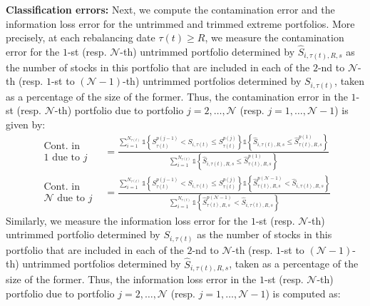 \textbf{Classification errors:} Next, we compute the contamination error and the information loss error for the untrimmed and trimmed extreme portfolios. More precisely, at each rebalancing date $\tau(t) \geq R$, we measure the contamination error for the $1$-st (resp. $\mathcal{N}$-th) untrimmed portfolio determined by $\widehat{S}_{i,\tau(t),R,s}$ as the number of stocks in this portfolio that are included in each of the $2$-nd to $\mathcal{N}$-th (resp. $1$-st to $(\mathcal{N}-1)$-th) untrimmed portfolios determined by $S_{i,\tau(t)}$, taken as a percentage of the size of the former. Thus, the contamination error in the $1$-st (resp. $\mathcal{N}$-th) portfolio due to portfolio $j=2,\ldots, \mathcal{N}$ (resp. $j=1,\ldots, \mathcal{N}-1$) is given by:
\begin{align*}
\begin{aligned}
\text{Cont. in}\\[-11pt]
\text{$1$ due to $j$} 
\end{aligned}
&= \frac{\sum_{i=1}^{N_{\tau(t)}} \mathds{1} \left\{ S_{\tau(t) }^{p(j-1)} < S_{i,\tau(t)} \leq S_{\tau(t) }^{p(j)} \right\} \mathds{1} \left\{ \widehat{S}_{i,\tau(t),R,s} \leq \widehat{S}_{\tau(t),R,s}^{p(1)}\right\}}{\sum_{i=1}^{N_{\tau(t)}} \mathds{1} \left\{ \widehat{S}_{i,\tau(t),R,s}\leq \widehat{S}_{\tau(t),R,s}^{p(1)}\right\}} \\
\begin{aligned}
\text{Cont. in}\\[-11pt]
\text{$\mathcal{N}$ due to $j$}
\end{aligned}
&= \frac{\sum_{i=1}^{N_{\tau(t)}} \mathds{1} \left\{ S_{\tau(t) }^{p(j-1)} < S_{i,\tau(t)} \leq S_{\tau(t) }^{p(j)} \right\} \mathds{1} \left\{ \widehat{S}_{\tau(t),R,s}^{p(\mathcal{N}-1)} < \widehat{S}_{i,\tau(t),R,s} \right\}}{\sum_{i=1}^{N_{\tau(t)}} \mathds{1} \left\{ \widehat{S}_{\tau(t),R,s}^{p(\mathcal{N}-1)} < \widehat{S}_{i,\tau(t),R,s} \right\}}
\end{align*}
Similarly, we measure the information loss error for the $1$-st (resp. $\mathcal{N}$-th) untrimmed portfolio determined by $S_{i,\tau(t)}$ as the number of stocks in this portfolio that are included in each of the $2$-nd to $\mathcal{N}$-th (resp. $1$-st to $(\mathcal{N}-1)$-th) untrimmed portfolios determined by $\widehat{S}_{i,\tau(t),R,s}$, taken as a percentage of the size of the former. Thus, the information loss error in the $1$-st (resp. $\mathcal{N}$-th) portfolio due to portfolio $j=2,\ldots, \mathcal{N}$ (resp. $j=1,\ldots, \mathcal{N}-1$) is computed as:
